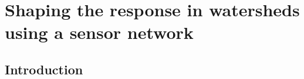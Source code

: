 \chapter{Shaping the response in watersheds using a sensor network}\label{ch:shaping}
\section{Introduction}




